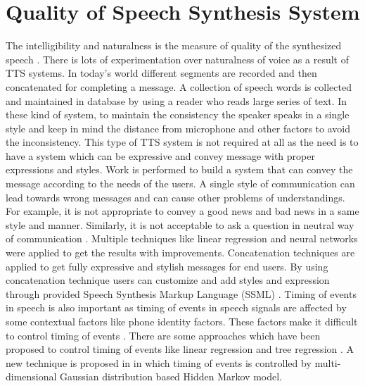 \section{Quality of Speech Synthesis System}
The intelligibility and naturalness is the measure of quality of the synthesized speech \cite{swetha2013text}. 
There is lots of experimentation over naturalness of voice as a result of TTS
systems. In today’s world different segments are recorded and then concatenated for completing a
message. A collection of speech words is collected and maintained in database by using a reader
who reads large series of text. In these kind of system, to maintain the consistency the speaker
speaks in a single style and keep in mind the distance from microphone and other factors to avoid
the inconsistency. This type of TTS system is not required at all as the need is to have a system
which can be expressive and convey message with proper expressions and styles. Work is
performed to build a system that can convey the message according to the needs of the users. A
single style of communication can lead towards wrong messages and can cause other problems of
understandings. For example, it is not appropriate to convey a good news and bad news in a same
style and manner. Similarly, it is not acceptable to ask a question in neutral way of communication \cite{eide2004corpus}.
Multiple techniques like linear regression and neural networks were applied
to get the results with improvements. Concatenation techniques are applied to get fully
expressive and stylish messages for end users. By using concatenation technique users can
customize and add styles and expression through provided Speech Synthesis Markup Language (SSML) \cite{eide2004corpus}. 
Timing of events in speech is also important as timing of events in
speech signals are affected by some contextual factors like phone identity factors. These factors
make it difficult to control timing of events \cite{tokuda2000speech}. There are some approaches which have been proposed
to control timing of events like linear regression \cite{kaiki1992linguistic} and tree regression \cite{riley1992tree}. 
A new technique is proposed in \cite{tokuda2000speech} in which timing of events is
controlled by multi-dimensional Gaussian distribution based Hidden Markov model.


